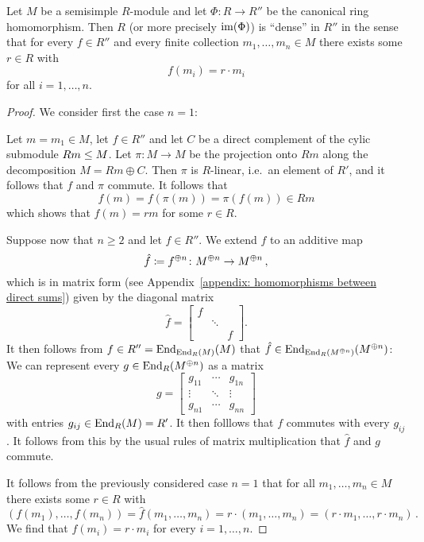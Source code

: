 \begin{theorem}
  \label{theorem: first jacobson density theorem}
  Let $M$ be a semisimple $R$-module and let $\Phi \colon R \to R''$ be the canonical ring homomorphism.
  Then $R$ (or more precisely $\operatorname{im}(\Phi)$) is \enquote{dense} in $R''$ in the sense that for every $f \in R''$ and every finite collection $m_1, \dotsc, m_n \in M$ there exists some $r \in R$ with
  \[
      f(m_i)
    = r \cdot m_i
  \]
  for all $i = 1, \dotsc, n$.
\end{theorem}


\begin{proof}
  We consider first the case $n = 1$:
  
  Let $m = m_1 \in M$, let $f \in R''$ and let $C$ be a direct complement of the cylic submodule $Rm \leq M$.
  Let $\pi \colon M \to M$ be the projection onto $Rm$ along the decomposition $M = Rm \oplus C$.
  Then $\pi$ is $R$-linear, i.e.\ an element of $R'$, and it follows that $f$ and $\pi$ commute.
  It follows that
  \[
        f(m)
    =   f(\pi(m))
    =   \pi(f(m))
    \in Rm
  \]
  which shows that $f(m) = rm$ for some $r \in R$.
  
  Suppose now that $n \geq 2$ and let $f \in R''$.
  We extend $f$ to an additive map
  \[
              \hat{f}
    \coloneqq  f^{\oplus n}
    \colon    M^{\oplus n}
    \to       M^{\oplus n} \,,
  \]
  which is in matrix form (see Appendix~\ref{appendix: homomorphisms between direct sums}) given by the diagonal matrix
  \[
      \hat{f}
    = \begin{bmatrix}
        f &         &   \\  
          & \ddots  &   \\
          &         & f
      \end{bmatrix}.
  \]
  It then follows from $f \in R'' = \operatorname{End}_{\operatorname{End}_R(M)}(M)$ that $\hat{f} \in \operatorname{End}_{\operatorname{End}_R(M^{\oplus n})}(M^{\oplus n})$:
  We can represent every $g \in \operatorname{End}_R(M^{\oplus n})$ as a matrix
  \[
      g
    = \begin{bmatrix}
        g_{11}  & \cdots  & g_{1n}  \\
        \vdots  & \ddots  & \vdots  \\
        g_{n1}  & \cdots  & g_{nn}
      \end{bmatrix}
  \]
  with entries $g_{ij} \in \operatorname{End}_R(M) = R'$.
  It then folllows that $f$ commutes with every $g_{ij}$.
  It follows from this by the usual rules of matrix multiplication that $\hat{f}$ and $g$ commute.
  
  It follows from the previously considered case $n = 1$ that for all $m_1, \dotsc, m_n \in M$ there exists some $r \in R$ with
  \[
      (f(m_1), \dotsc, f(m_n))
    = \hat{f}(m_1, \dotsc, m_n)
    = r \cdot (m_1, \dotsc, m_n)
    = (r \cdot m_1, \dotsc, r \cdot m_n) \,.
  \]
  We find that $f(m_i) = r \cdot m_i$ for every $i = 1, \dotsc, n$.
\end{proof}


